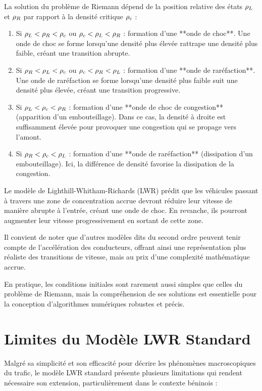 La solution du problème de Riemann dépend de la position relative des états $\rho_L$ et $\rho_R$ par rapport à la densité critique $\rho_c$ :

\begin{enumerate}
    \item Si $\rho_L < \rho_R < \rho_c$ ou $\rho_c < \rho_L < \rho_R$ : formation d'une **onde de choc**. Une onde de choc se forme lorsqu'une densité plus élevée rattrape une densité plus faible, créant une transition abrupte.
    \item Si $\rho_R < \rho_L < \rho_c$ ou $\rho_c < \rho_R < \rho_L$ : formation d'une **onde de raréfaction**. Une onde de raréfaction se forme lorsqu'une densité plus faible suit une densité plus élevée, créant une transition progressive.
    \item Si $\rho_L < \rho_c < \rho_R$ : formation d'une **onde de choc de congestion** (apparition d'un embouteillage). Dans ce cas, la densité à droite est suffisamment élevée pour provoquer une congestion qui se propage vers l'amont.
    \item Si $\rho_R < \rho_c < \rho_L$ : formation d'une **onde de raréfaction** (dissipation d'un embouteillage). Ici, la différence de densité favorise la dissipation de la congestion.
\end{enumerate}

Le modèle de Lighthill-Whitham-Richards (LWR) prédit que les véhicules passant à travers une zone de concentration accrue devront réduire leur vitesse de manière abrupte à l'entrée, créant une onde de choc. En revanche, ils pourront augmenter leur vitesse progressivement en sortant de cette zone.

Il convient de noter que d'autres modèles dits du second ordre peuvent tenir compte de l'accélération des conducteurs, offrant ainsi une représentation plus réaliste des transitions de vitesse, mais au prix d'une complexité mathématique accrue.

En pratique, les conditions initiales sont rarement aussi simples que celles du problème de Riemann, mais la compréhension de ses solutions est essentielle pour la conception d'algorithmes numériques robustes et précis.

\section{Limites du Modèle LWR Standard}
\label{sec:limites_lwr}

Malgré sa simplicité et son efficacité pour décrire les phénomènes macroscopiques du trafic, le modèle LWR standard présente plusieurs limitations qui rendent nécessaire son extension, particulièrement dans le contexte béninois :

